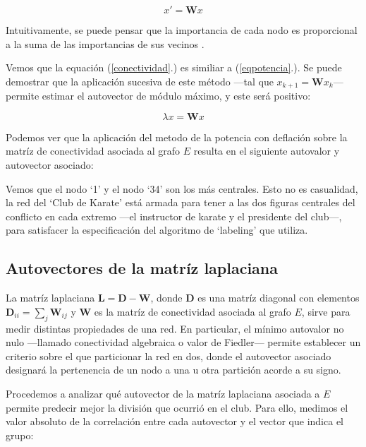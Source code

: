 \vspace{1em}
\begin{equation} \label{conectividad}
    x' = \mathbf{W} x
\end{equation}

\vspace{1em}
Intuitivamente, se puede pensar que la importancia de cada nodo es proporcional a la suma de las importancias de sus vecinos . 

\vspace{1em}
Vemos que la equación (\ref{conectividad}.) es similiar a (\ref{eqpotencia}.). Se puede demostrar  que la aplicación sucesiva de este método ---tal que $x_{k + 1} = \mathbf{W} x_k$--- permite estimar el autovector de módulo máximo, y este será positivo:

\vspace{1em}
\begin{equation} \label{conectividad}
    \lambda x = \mathbf{W} x
\end{equation}

\vspace{1em}
Podemos ver que la aplicación del metodo de la potencia con deflación sobre la matríz de conectividad asociada al grafo $E$ resulta en el siguiente autovalor y autovector asociado:

\vspace{1em}

\vspace{1em}
Vemos que el nodo `1' y el nodo `34' son los más centrales. Esto no es casualidad, la red del `Club de Karate' está armada para tener a las dos figuras centrales del conflicto en cada extremo ---el instructor de karate y el presidente del club---, para satisfacer la especificación del algoritmo de `labeling' que utiliza.





\vspace{2em}
\subsection{Autovectores de la matríz laplaciana} La matríz laplaciana $\mathbf{L} = \mathbf{D} - \mathbf{W}$, donde \textbf{D} es una matríz diagonal con elementos $\mathbf{D}_{ii} = \sum_j \mathbf{W}_{ij}$ y \textbf{W} es la matríz de conectividad asociada al grafo $E$, sirve para medir distintas propiedades de una red. En particular, el mínimo autovalor no nulo ---llamado conectividad algebraica o valor de Fiedler--- permite establecer un criterio sobre el que particionar la red en dos, donde el autovector asociado designará la pertenencia de un nodo a una u otra partición acorde a su signo. 

\vspace{1em}
Procedemos a analizar qué autovector de la matríz laplaciana asociada a $E$ permite predecir mejor la división que ocurrió en el club. Para ello, medimos el valor absoluto de la correlación entre cada autovector y el vector que indica el grupo:

\vspace{1em}
